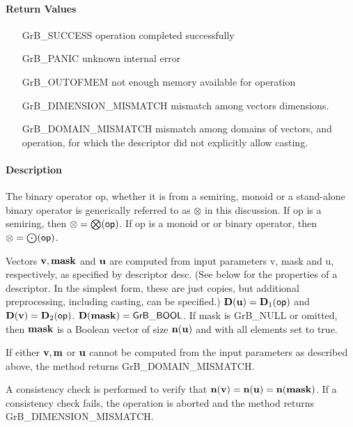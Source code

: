 \paragraph{Return Values}

\begin{itemize}[leftmargin=2.1in]
\item[{\sf GrB\_SUCCESS}]             operation completed successfully
\item[{\sf GrB\_PANIC}]               unknown internal error
\item[{\sf GrB\_OUTOFMEM}]            not enough memory available for operation
\item[{\sf GrB\_DIMENSION\_MISMATCH}] mismatch among vectors dimensions.
\item[{\sf GrB\_DOMAIN\_MISMATCH}]    mismatch among domains of vectors, and operation, for which the descriptor did not explicitly allow casting.
\end{itemize}

\paragraph{Description}

The binary operator {\sf op}, whether it is from a semiring, monoid or a stand-alone binary operator
is generically referred to as $\otimes$ in this discussion.
If {\sf op} is a semiring, then $\otimes = \bigotimes({\sf op})$. 
If {\sf op} is a monoid or or binary operator, then $\otimes = \bigodot({\sf op})$.

Vectors ${\bf v}, {\bf mask}$ and ${\bf u}$ are computed from
input parameters {\sf v}, {\sf mask} and {\sf u}, respectively, as specified
by descriptor {\sf desc}. (See below for the properties of a descriptor. In
the simplest form, these are just copies, but additional preprocessing,
including casting, can be specified.)  $\bold{D}({\bf u}) =
\bold{D}_1({\sf op})$ and $\bold{D}({\bf v}) = \bold{D}_2({\sf op})$.
$\bold{D}({\bf mask}) = {\sf GrB\_BOOL}$.  If {\sf mask} is {\sf GrB\_NULL} or omitted,
then ${\bf mask}$ is a Boolean vector of size $\bold{n}({\bf u})$
and with all elements set to {\sf true}.

If either ${\bf v}, {\bf m}$ or ${\bf u}$ cannot be computed
from the input parameters as described above, the method returns {\sf
GrB\_DOMAIN\_MISMATCH}.

A consistency check is performed to verify that $\bold{n}({\bf v})
= \bold{n}({\bf u}) = \bold{n}({\bf mask})$. If a consistency
check fails, the operation is aborted and the method returns {\sf
GrB\_DIMENSION\_MISMATCH}.

